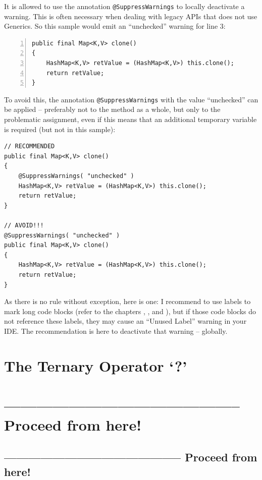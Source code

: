 It is allowed to use the annotation \lstinline|@SuppressWarnings|\autocite{ORACLE_DOC_SUPPRESSWARNINGS_ANNOTATION} to locally deactivate a warning. This is often necessary when dealing with legacy APIs that does not use Generics. So this sample would emit an “unchecked” warning for line 3:
\begin{lstlisting}[numbers=left]
public final Map<K,V> clone()
{
    HashMap<K,V> retValue = (HashMap<K,V>) this.clone();
    return retValue;
}
\end{lstlisting}

To avoid this, the annotation \lstinline|@SuppressWarnings| with the value “unchecked” can be applied – preferably not to the method as a whole, but only to the problematic assignment, even if this means that an additional temporary variable is required (but not in this sample):
\begin{lstlisting}
// RECOMMENDED
public final Map<K,V> clone()
{
    @SuppressWarnings( "unchecked" ) 
    HashMap<K,V> retValue = (HashMap<K,V>) this.clone();
    return retValue;
}

// AVOID!!!
@SuppressWarnings( "unchecked" ) 
public final Map<K,V> clone()
{
    HashMap<K,V> retValue = (HashMap<K,V>) this.clone();
    return retValue;
}
\end{lstlisting}

As there is no rule without exception, here is one: I recommend to use labels to mark long code blocks (refer to the chapters , , and ), but if those code blocks do not reference these labels, they may cause an “Unused Label” warning in your IDE. The recommendation is here to deactivate that warning – globally.



\section{The Ternary Operator ‘?’}\label{sec:TheTernaryOperator}
\section{-------------------------------------------- Proceed from here!}
\subsection{-------------------------------------------- Proceed from here!}
